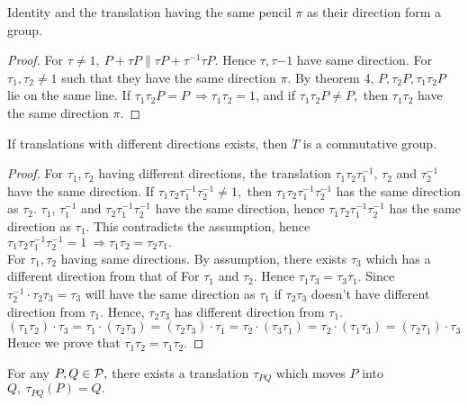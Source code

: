 \begin{theorem}
    Identity and the translation having the same pencil $\pi$ as their direction form a group.
\end{theorem}

\begin{proof}
    For  $\tau \neq 1, \: P + \tau P \parallel \tau P + \tau^{-1} \tau P. $ Hence $\tau, \tau{-1} $ have same direction. For $\tau_1, \tau_2 \neq 1$ such that they have the same direction $\pi.$ By theorem 4,  $P, \tau_2 P, \tau_1 \tau_2 P$ lie on the same line. If $\tau_1 \tau_2P=P \: \Rightarrow \tau_1 \tau_2 =1$,  and if $\tau_1 \tau_2P \neq P, $ then $\tau_1 \tau_2$ have the same direction $\pi.$
\end{proof}
\begin{theorem}
    If translations with different directions exists, then $T$ is a commutative group.
\end{theorem}

\begin{proof}
    For $\tau_1, \tau_2$ having different directions, the translation $\tau_1 \tau_2 \tau_1^{-1}$, $\tau_2$ and $\tau_2^{-1}$ have the same direction. If $\tau_1 \tau_2 \tau_1^{-1}\tau_2^{-1} \neq 1,$ then $\tau_1 \tau_2 \tau_1^{-1}\tau_2^{-1}$ has the same direction as $\tau_2.$ $\tau_1$, $\tau_1^{-1}$ and $\tau_2 \tau_1^{-1}\tau_2^{-1}$ have the same direction, hence $\tau_1 \tau_2 \tau_1^{-1}\tau_2^{-1}$ has the same direction as $\tau_1.$ This contradicts the assumption, hence $\tau_1 \tau_2 \tau_1^{-1}\tau_2^{-1} =1 \: \Rightarrow \tau_1 \tau_2=\tau_2 \tau_1. $ \\
    For $\tau_1, \tau_2$ having same directions. By assumption, there exists $\tau_3$ which has a different direction from that of For $\tau_1 $ and $ \tau_2.$ Hence $\tau_1 \tau_3 = \tau_3 \tau_1.$ Since $\tau_2^{-1} \cdot \tau_2 \tau_3 = \tau_3$ will have the same direction as $\tau_1$ if $\tau_2 \tau_3$ doesn't have different direction from $\tau_1$. Hence, $\tau_2 \tau_3$ has different direction from $\tau_1$.
    \[ (\tau_1 \tau_2 ) \cdot \tau_3 = \tau_1 \cdot (\tau_2\tau_3) = (\tau_2 \tau_3) \cdot \tau_1 = \tau_2 \cdot (\tau_3 \tau_1) = \tau_2 \cdot (\tau_1 \tau_3) = (\tau_2 \tau_1) \cdot \tau_3\]
    Hence we prove that $\tau_1 \tau_2=\tau_1 \tau_2.$
\end{proof}

\begin{axiom}[4a]
    For any $P, Q \in \mathcal{P},$ there exists a translation $\tau_{PQ}$ which moves $P$ into $Q, \: \tau_{PQ}(P)=Q.$ 
\end{axiom}

